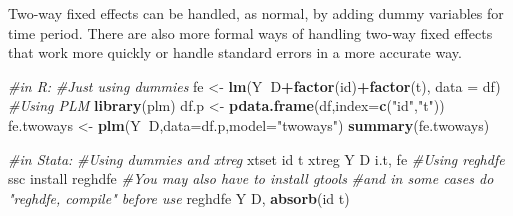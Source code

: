 \documentclass[]{book}
\newenvironment{Shaded}{\begin{snugshade}}{\end{snugshade}}
\newcommand{\KeywordTok}[1]{\textcolor[rgb]{0.13,0.29,0.53}{\textbf{#1}}}
\newcommand{\DataTypeTok}[1]{\textcolor[rgb]{0.13,0.29,0.53}{#1}}
\newcommand{\StringTok}[1]{\textcolor[rgb]{0.31,0.60,0.02}{#1}}
\newcommand{\CommentTok}[1]{\textcolor[rgb]{0.56,0.35,0.01}{\textit{#1}}}
\newcommand{\OperatorTok}[1]{\textcolor[rgb]{0.81,0.36,0.00}{\textbf{#1}}}
\newcommand{\NormalTok}[1]{#1}
\theoremstyle{definition}
\theoremstyle{definition}
\theoremstyle{definition}
\theoremstyle{remark}
\begin{document}
Two-way fixed effects can be handled, as normal, by adding dummy
variables for time period. There are also more formal ways of handling
two-way fixed effects that work more quickly or handle standard errors
in a more accurate way.

\begin{Shaded}
\begin{Highlighting}[]
\CommentTok{#in R:}
\CommentTok{#Just using dummies}
\NormalTok{fe <-}\StringTok{ }\KeywordTok{lm}\NormalTok{(Y}\OperatorTok{~}\NormalTok{D}\OperatorTok{+}\KeywordTok{factor}\NormalTok{(id)}\OperatorTok{+}\KeywordTok{factor}\NormalTok{(t), }\DataTypeTok{data =}\NormalTok{ df)}
\CommentTok{#Using PLM}
\KeywordTok{library}\NormalTok{(plm)}
\NormalTok{df.p <-}\StringTok{ }\KeywordTok{pdata.frame}\NormalTok{(df,}\DataTypeTok{index=}\KeywordTok{c}\NormalTok{(}\StringTok{"id"}\NormalTok{,}\StringTok{"t"}\NormalTok{))}
\NormalTok{fe.twoways <-}\StringTok{ }\KeywordTok{plm}\NormalTok{(Y}\OperatorTok{~}\NormalTok{D,}\DataTypeTok{data=}\NormalTok{df.p,}\DataTypeTok{model=}\StringTok{"twoways"}\NormalTok{)}
\KeywordTok{summary}\NormalTok{(fe.twoways)}

\CommentTok{#in Stata:}
\CommentTok{#Using dummies and xtreg}
\NormalTok{xtset id t}
\NormalTok{xtreg Y D i.t, fe}
\CommentTok{#Using reghdfe}
\NormalTok{ssc install reghdfe}
\CommentTok{#You may also have to install gtools}
\CommentTok{#and in some cases do "reghdfe, compile" before use}
\NormalTok{reghdfe Y D, }\KeywordTok{absorb}\NormalTok{(id t)}
\end{Highlighting}
\end{Shaded}
\end{document}
